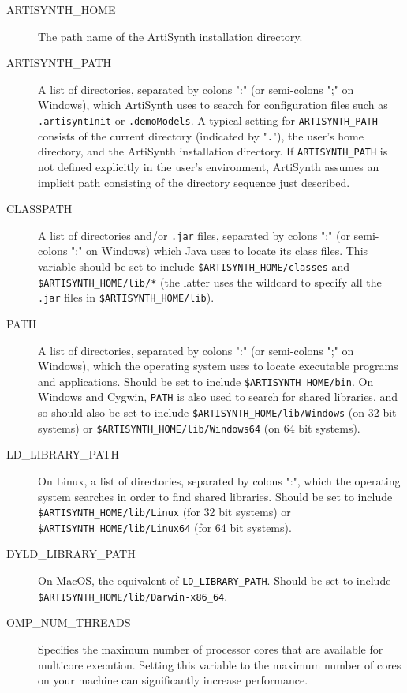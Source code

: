 \documentclass{article}
\begin{document}
\begin{description}

\item[ARTISYNTH\_HOME]\mbox{}
 
The path name of the ArtiSynth installation directory.

\item[ARTISYNTH\_PATH]\mbox{}

A list of directories, separated by colons ":" (or
semi-colons ";" on Windows), which ArtiSynth uses to search for
configuration files such as {\tt .artisyntInit} or {\tt .demoModels}.  A
typical setting for {\tt ARTISYNTH\_PATH} consists of the current directory
(indicated by "{\tt .}"), the user's home directory, and the ArtiSynth
installation directory. If {\tt ARTISYNTH\_PATH} is not defined explicitly
in the user's environment, ArtiSynth assumes an implicit path
consisting of the directory sequence just described.

\item[CLASSPATH]\mbox{}

A list of directories and/or {\tt .jar} files, separated by 
colons ":" (or semi-colons ";" on Windows) which Java uses to
locate its class files. This variable should be set to
include {\tt \$ARTISYNTH\_HOME/classes} and {\tt \$ARTISYNTH\_HOME/lib/*}
(the latter uses the wildcard {\tt *} to specify all the {\tt .jar} files
in {\tt \$ARTISYNTH\_HOME/lib}).

\item[PATH]\mbox{}
 
A list of directories, separated by colons ":" (or semi-colons ";" on
Windows), which the operating system uses to locate executable programs and
applications. Should be set to include {\tt \$ARTISYNTH\_HOME/bin}.  On Windows
and Cygwin, {\tt PATH} is also used to search for shared libraries,
and so should also be set to include
{\tt \$ARTISYNTH\_HOME/lib/Windows} (on 32 bit systems)
or {\tt \$ARTISYNTH\_HOME/lib/Windows64} (on 64 bit systems).

\item[LD\_LIBRARY\_PATH]\mbox{}

On Linux, a list of directories, separated by colons
":", which the operating system searches in order to find shared libraries.
Should be set to include {\tt \$ARTISYNTH\_HOME/lib/Linux} 
(for 32 bit systems) or {\tt \$ARTISYNTH\_HOME/lib/Linux64} (for 64 bit systems).

\item[DYLD\_LIBRARY\_PATH]\mbox{}

On MacOS, the equivalent of {\tt LD\_LIBRARY\_PATH}.
Should be set to include {\tt \$ARTISYNTH\_HOME/lib/Darwin-x86\_64}.

\item[OMP\_NUM\_THREADS]\mbox{}
 
Specifies the maximum number of processor cores that are available for
multicore execution. Setting this variable to the maximum number of
cores on your machine can significantly increase performance.

\end{description}
\end{document}

